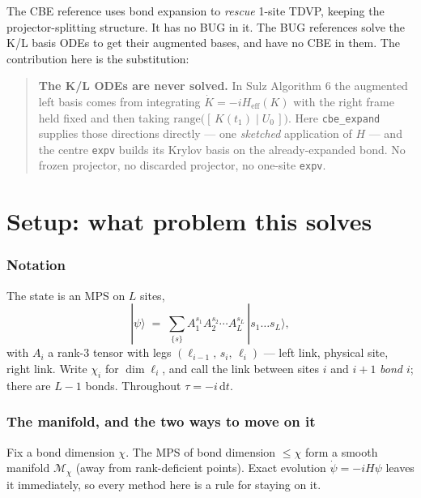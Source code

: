 \documentclass[11pt,a4paper]{article}
\newcommand{\code}[1]{\texttt{\small #1}}
\newcommand{\dd}{\mathrm{d}}
\begin{document}
\noindent
The CBE reference uses bond expansion to \emph{rescue} 1-site TDVP, keeping the
projector-splitting structure. It has no BUG in it. The BUG references solve the K/L basis
ODEs to get their augmented bases, and have no CBE in them. The contribution here is the
substitution:

\begin{quote}
\color{note}
\textbf{The K/L ODEs are never solved.} In Sulz Algorithm 6 the augmented left basis comes from
integrating $\dot K = -i H_{\text{eff}}(K)$ with the right frame held fixed and then taking
$\mathrm{range}\big([\,K(t_1)\mid U_0\,]\big)$. Here \code{cbe\_expand} supplies those
directions directly --- one \emph{sketched} application of $H$ --- and the centre \code{expv}
builds its Krylov basis on the already-expanded bond. No frozen projector, no discarded
projector, no one-site \code{expv}.
\end{quote}

\part{Setup: what problem this solves}
\label{part:setup}

\section{Notation}

The state is an MPS on $L$ sites,
\[
  |\psi\rangle \;=\; \sum_{\{s\}} A_1^{s_1} A_2^{s_2}\cdots A_L^{s_L}\,|s_1\dots s_L\rangle ,
\]
with $A_i$ a rank-3 tensor with legs $(\ell_{i-1},\, s_i,\, \ell_i)$ --- left link, physical
site, right link. Write $\chi_i$ for $\dim \ell_i$, and call the link between sites $i$ and
$i+1$ \emph{bond $i$}; there are $L-1$ bonds. Throughout $\tau = -i\,\dd t$.

\section{The manifold, and the two ways to move on it}

Fix a bond dimension $\chi$. The MPS of bond dimension $\le\chi$ form a smooth manifold
$\mathcal{M}_\chi$ (away from rank-deficient points). Exact evolution $\dot\psi = -iH\psi$
leaves it immediately, so every method here is a rule for staying on it.
\end{document}
